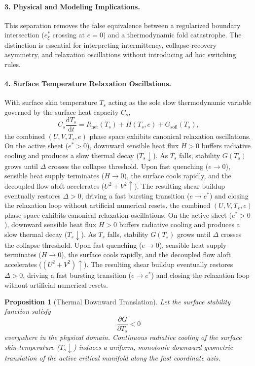\documentclass[11pt,letterpaper]{article}
\newtheorem{proposition}{Proposition}
\begin{document}
\paragraph{3. Physical and Modeling Implications.}
This separation removes the false equivalence between a regularized boundary intersection ($e_\xi^*$ crossing at $e=0$) and a thermodynamic fold catastrophe. The distinction is essential for interpreting intermittency, collapse-recovery asymmetry, and relaxation oscillations without introducing ad hoc switching rules.

\paragraph{4. Surface Temperature Relaxation Oscillations.}
With surface skin temperature $T_s$ acting as the sole slow thermodynamic variable governed by the surface heat capacity $C_s$,
\begin{equation}
C_s \frac{\mathrm{d}T_s}{\mathrm{d}t} = R_{\mathrm{net}}(T_s) + H(T_s,e) + G_{\mathrm{soil}}(T_s),
\end{equation}
the combined $(U,V,T_s,e)$ phase space exhibits canonical relaxation oscillations. On the active sheet ($e^*>0$), downward sensible heat flux $H>0$ buffers radiative cooling and produces a slow thermal decay ($T_s \downarrow$). As $T_s$ falls, stability $G(T_s)$ grows until $\Delta$ crosses the collapse threshold. Upon fast quenching ($e \to 0$), sensible heat supply terminates ($H \to 0$), the surface cools rapidly, and the decoupled flow aloft accelerates ($U^2+V^2 \uparrow$). The resulting shear buildup eventually restores $\Delta>0$, driving a fast bursting transition ($e \to e^*$) and closing the relaxation loop without artificial numerical resets.
the combined $(U,V,T_s,e)$ phase space exhibits canonical relaxation oscillations.
On the active sheet ($e^*>0$), downward sensible heat flux $H>0$ buffers
radiative cooling and produces a slow thermal decay ($T_s \downarrow$).
As $T_s$ falls, stability $G(T_s)$ grows until $\Delta$ crosses the
collapse threshold. Upon fast quenching ($e \to 0$), sensible heat supply
terminates ($H \to 0$), the surface cools rapidly, and the decoupled flow
aloft accelerates ($(U^2+V^2) \uparrow$). The resulting shear buildup
eventually restores $\Delta>0$, driving a fast bursting transition
($e \to e^*$) and closing the relaxation loop without artificial
numerical resets.

\begin{proposition}[Thermal Downward Translation]
\label{prop:thermal_shift_proof}
Let the surface stability function satisfy
\begin{equation}
\frac{\partial G}{\partial T_s} < 0
\end{equation}
everywhere in the physical domain.
Continuous radiative cooling of the surface skin temperature ($T_s \downarrow$)
induces a uniform, monotonic downward geometric translation of the active
critical manifold along the fast coordinate axis.
\end{proposition}
\end{document}
